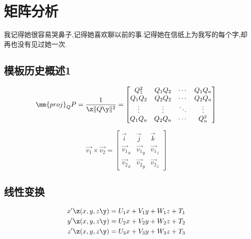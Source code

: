 \chapter{矩阵分析}
\begin{center}
    \textcolor[RGB]{255, 0, 0}{\faHeart}我记得她很容易哭鼻子,记得她喜欢聊以前的事.记得她在信纸上为我写的每个字,却再也没有见过她一次.\textcolor[RGB]{255, 0, 0}{\faHeart}
\end{center}
\vspace{-5pt}
\begin{center}
\end{center}

\section{模板历史概述1}
\[
    \mm{proj}_QP=\frac{1}{\z\| Q \y\|^2}=
    \begin{bmatrix}
        Q_1^2  & Q_1Q_2 & \cdots & Q_1Q_n \\
        Q_1Q_2 & Q_2Q_2 & \cdots & Q_2Q_n \\
        \vdots & \vdots & \ddots & \vdots \\
        Q_1Q_n & Q_2Q_n & \cdots & Q_n^2  \\
    \end{bmatrix}
\]

\[
    \overrightarrow{v_1} \times \overrightarrow{v_2} = \begin{bmatrix}
        \vec{i}                & \vec{j}                & \vec{k}                \\
        \overrightarrow{v_1}_x & \overrightarrow{v_1}_y & \overrightarrow{v_1}_z \\
        \overrightarrow{v_2}_x & \overrightarrow{v_2}_y & \overrightarrow{v_2}_z
    \end{bmatrix}
\]

\section{线性变换}

\begin{align*}
    x'\z(x,y,z\y) & = U_1x+V_1y+W_1z+T_1 \\
    y'\z(x,y,z\y) & = U_2x+V_2y+W_2z+T_2 \\
    z'\z(x,y,z\y) & = U_3x+V_3y+W_3z+T_3
\end{align*}


